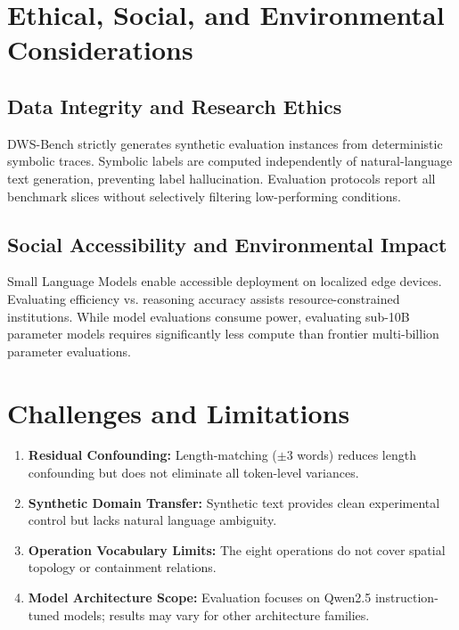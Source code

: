 \documentclass{iutbscthesis}
\begin{document}
\chapter{Ethical, Social, and Environmental Considerations}

\section{Data Integrity and Research Ethics}
DWS-Bench strictly generates synthetic evaluation instances from deterministic symbolic traces. Symbolic labels are computed independently of natural-language text generation, preventing label hallucination. Evaluation protocols report all benchmark slices without selectively filtering low-performing conditions.

\section{Social Accessibility and Environmental Impact}
Small Language Models enable accessible deployment on localized edge devices. Evaluating efficiency vs. reasoning accuracy assists resource-constrained institutions. While model evaluations consume power, evaluating sub-10B parameter models requires significantly less compute than frontier multi-billion parameter evaluations.

\chapter{Challenges and Limitations}

\begin{enumerate}[noitemsep]
    \item \textbf{Residual Confounding:} Length-matching ($\pm 3$ words) reduces length confounding but does not eliminate all token-level variances.
    \item \textbf{Synthetic Domain Transfer:} Synthetic text provides clean experimental control but lacks natural language ambiguity.
    \item \textbf{Operation Vocabulary Limits:} The eight operations do not cover spatial topology or containment relations.
    \item \textbf{Model Architecture Scope:} Evaluation focuses on Qwen2.5 instruction-tuned models; results may vary for other architecture families.
\end{enumerate}
\end{document}
